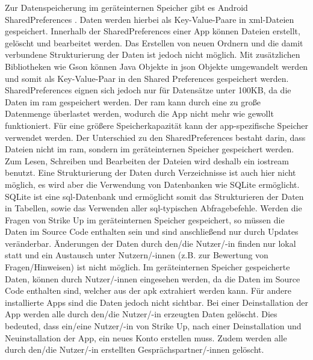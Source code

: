 Zur Datenspeicherung im geräteinternen Speicher gibt es Android SharedPreferences \cite{misc:sharedpreferences}. Daten werden hierbei als Key-Value-Paare in \acrshort{xml}-Dateien gespeichert.
Innerhalb der SharedPreferences einer App können Dateien erstellt, gelöscht und bearbeitet werden. Das Erstellen von neuen Ordnern und die damit verbundene Strukturierung der Daten ist jedoch nicht möglich. \newline
Mit zusätzlichen Bibliotheken wie Gson \cite{misc:gson} können Java Objekte in \gls{json} Objekte umgewandelt werden und somit als Key-Value-Paar in den Shared Preferences gespeichert
werden. \newline
SharedPreferences eignen sich jedoch nur für Datensätze unter 100KB, da die Daten im \gls{ram} gespeichert werden. Der \gls{ram} kann durch eine zu große Datenmenge überlastet werden,
wodurch die App nicht mehr wie gewollt funktioniert. Für eine größere Speicherkapazität kann der app-spezifische Speicher \cite{misc:appspecificstorage} verwendet werden. Der Unterschied
zu den SharedPreferences bestaht darin, dass Dateien  nicht im \gls{ram}, sondern im geräteinternen Speicher gespeichert werden. Zum Lesen, Schreiben und Bearbeiten der Dateien wird
deshalb ein \gls{iostream} benutzt. Eine Strukturierung der Daten durch Verzeichnisse ist auch hier nicht möglich, es wird aber die Verwendung von Datenbanken wie SQLite \cite{misc:sqlite}
ermöglicht. SQLite ist eine \gls{sql}-Datenbank und ermöglicht somit das Strukturieren der Daten in Tabellen, sowie das Verwenden aller \gls{sql}-typischen Abfragebefehle. \newline
Werden die Fragen von Strike Up im geräteinternen Speicher gespeichert, so müssen die Daten im Source Code enthalten sein und sind anschließend nur durch Updates veränderbar. Änderungen der
Daten durch den/die Nutzer/-in finden nur lokal statt und ein Austausch unter Nutzern/-innen (z.B. zur Bewertung von Fragen/Hinweisen) ist nicht möglich. \newline
Im geräteinternen Speicher gespeicherte Daten, können durch Nutzer/-innen eingesehen werden, da die Daten im Source Code enthalten sind, welcher aus der \gls{apk} extrahiert werden kann.
Für andere installierte Apps sind die Daten jedoch nicht sichtbar. \newline
Bei einer Deinstallation der App werden alle durch den/die Nutzer/-in erzeugten Daten gelöscht. Dies bedeuted, dass ein/eine Nutzer/-in von Strike Up, nach einer Deinstallation und Neuinstallation
der App, ein neues Konto erstellen muss. Zudem werden alle durch den/die Nutzer/-in erstellten Gesprächspartner/-innen gelöscht.

